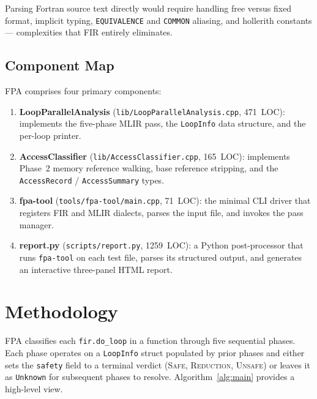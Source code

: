 \documentclass[conference]{IEEEtran}
\begin{document}
Parsing Fortran source text directly would require handling free versus
fixed format, implicit typing, \texttt{EQUIVALENCE} and
\texttt{COMMON} aliasing, and hollerith constants — complexities that
FIR entirely eliminates.

\subsection{Component Map}

FPA comprises four primary components:

\begin{enumerate}
  \item \textbf{LoopParallelAnalysis} (\texttt{lib/LoopParallelAnalysis.cpp},
        471~LOC): implements the five-phase MLIR pass, the
        \texttt{LoopInfo} data structure, and the per-loop printer.
  \item \textbf{AccessClassifier} (\texttt{lib/AccessClassifier.cpp},
        165~LOC): implements Phase~2 memory reference walking, base
        reference stripping, and the \texttt{AccessRecord} /
        \texttt{AccessSummary} types.
  \item \textbf{fpa-tool} (\texttt{tools/fpa-tool/main.cpp}, 71~LOC):
        the minimal CLI driver that registers FIR and MLIR dialects,
        parses the input file, and invokes the pass manager.
  \item \textbf{report.py} (\texttt{scripts/report.py}, 1259~LOC):
        a Python post-processor that runs \texttt{fpa-tool} on each
        test file, parses its structured output, and generates an
        interactive three-panel HTML report.
\end{enumerate}

\section{Methodology}
\label{sec:methodology}

FPA classifies each \texttt{fir.do\_loop} in a function through five
sequential phases.  Each phase operates on a \texttt{LoopInfo} struct
populated by prior phases and either sets the \texttt{safety} field
to a terminal verdict (\textsc{Safe}, \textsc{Reduction},
\textsc{Unsafe}) or leaves it as \texttt{Unknown} for subsequent phases
to resolve.  Algorithm~\ref{alg:main} provides a high-level view.
\end{document}
